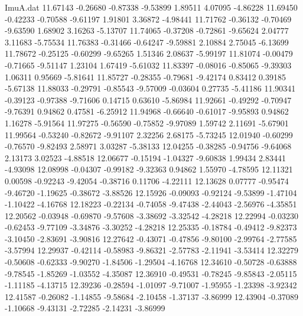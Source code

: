 \begin{filecontents}{ImuA.dat}
  11.67143   -0.26680   -0.87338   -9.53899    1.89511    4.07095   -4.86228
  11.69450   -0.42233   -0.70588   -9.61197    1.91801    3.36872   -4.98441
  11.71762   -0.36132   -0.70469   -9.63590    1.68902    3.16263   -5.13707
  11.74065   -0.37208   -0.72861   -9.65624    2.04777    3.11683   -5.75534
  11.76383   -0.31466   -0.64247   -9.59881    2.10884    2.75045   -6.13699
  11.78672   -0.25125   -0.60299   -9.65265    1.51346    2.08637   -5.99197
  11.81074   -0.00479   -0.71665   -9.51147    1.23104    1.67419   -5.61032
  11.83397   -0.08016   -0.85065   -9.39303    1.06311    0.95669   -5.81641
  11.85727   -0.28355   -0.79681   -9.42174    0.83412    0.39185   -5.67138
  11.88033   -0.29791   -0.85543   -9.57009   -0.03604    0.27735   -5.41186
  11.90341   -0.39123   -0.97388   -9.71606    0.14715    0.63610   -5.86984
  11.92661   -0.49292   -0.70947   -9.76391    0.94862    0.47581   -6.25912
  11.94968   -0.66640   -0.61017   -9.95893    0.94862    1.16278   -5.91564
  11.97275   -0.56590   -0.75852   -9.97089    1.59742    2.11691   -5.67901
  11.99564   -0.53240   -0.82672   -9.91107    2.32256    2.68175   -5.73245
  12.01940   -0.60299   -0.76570   -9.82493    2.58971    3.03287   -5.38133
  12.04255   -0.38285   -0.94756   -9.64068    2.13173    3.02523   -4.88518
  12.06677   -0.15194   -1.04327   -9.60838    1.99434    2.83441   -4.93098
  12.08998   -0.04307   -0.99182   -9.32363    0.94862    1.55970   -4.78595
  12.11321    0.00598   -0.92243   -9.42054   -0.38716    0.11706   -4.22111
  12.13628    0.07777   -0.95474   -9.46720   -1.19625   -0.38672   -3.88526
  12.15926   -0.09093   -0.92124   -9.53899   -1.47104   -1.10422   -4.16768
  12.18223   -0.22134   -0.74058   -9.47438   -2.44043   -2.56976   -4.35851
  12.20562   -0.03948   -0.69870   -9.57608   -3.38692   -3.32542   -4.28218
  12.22994   -0.03230   -0.62453   -9.77109   -3.34876   -3.30252   -4.28218
  12.25335   -0.18784   -0.49412   -9.82373   -3.10450   -2.83691   -3.90816
  12.27642   -0.43071   -0.47856   -9.80100   -2.99764   -2.77585   -3.57994
  12.29937   -0.42114   -0.58983   -9.86321   -2.57783   -2.11941   -3.53414
  12.32279   -0.50608   -0.62333   -9.90270   -1.84506   -1.29504   -4.16768
  12.34610   -0.50728   -0.63888   -9.78545   -1.85269   -1.03552   -4.35087
  12.36910   -0.49531   -0.78245   -9.85843   -2.05115   -1.11185   -4.13715
  12.39236   -0.28594   -1.01097   -9.71007   -1.95955   -1.23398   -3.92342
  12.41587   -0.26082   -1.14855   -9.58684   -2.10458   -1.37137   -3.86999
  12.43904   -0.37089   -1.10668   -9.43131   -2.72285   -2.14231   -3.86999

\end{filecontents}
